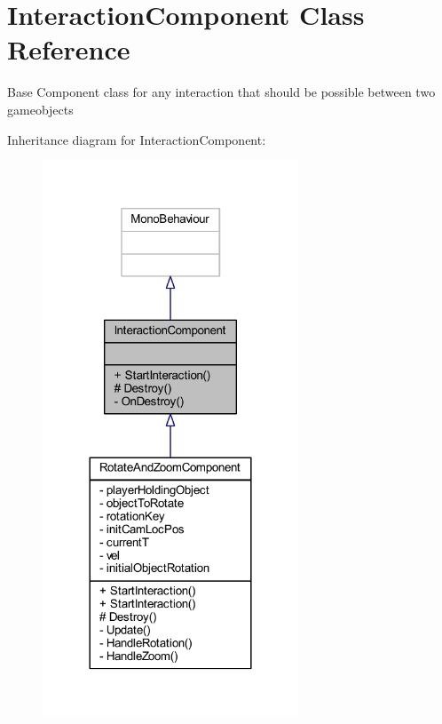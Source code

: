 \hypertarget{class_interaction_component}{}\section{Interaction\+Component Class Reference}
\label{class_interaction_component}


Base Component class for any interaction that should be possible between two gameobjects  




Inheritance diagram for Interaction\+Component\+:
\nopagebreak
\begin{figure}[H]
\begin{center}
\leavevmode
\includegraphics[width=216pt]{class_interaction_component__inherit__graph}
\end{center}
\end{figure}


